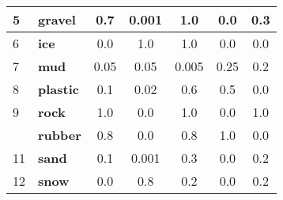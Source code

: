 \begin{table}[H]
\begin{tabular}{|l|l|c|c|c|c|c|}
\cellcolor[HTML]{737F9C}5                         & \textbf{gravel}        & 0.7                                     & 0.001                                      & 1.0                                    & 0.0                                      & 0.3                                  \\ \hline
\cellcolor[HTML]{D7E3FF}6                         & \textbf{ice}           & 0.0                                     & 1.0                                        & 1.0                                    & 0.0                                      & 0.0                                  \\ \hline
\cellcolor[HTML]{646464}7                         & \textbf{mud}           & 0.05                                    & 0.05                                       & 0.005                                  & 0.25                                     & 0.2                                  \\ \hline
\cellcolor[HTML]{96FABE}8                         & \textbf{plastic}       & 0.1                                     & 0.02                                       & 0.6                                    & 0.5                                      & 0.0                                  \\ \hline
\cellcolor[HTML]{6E5A3C}9                         & \textbf{rock}          & 1.0                                     & 0.0                                        & 1.0                                    & 0.0                                      & 1.0                                  \\ \hline
\cellcolor[HTML]{000000}{\color[HTML]{FFFFFF} 10} & \textbf{rubber}        & 0.8                                     & 0.0                                        & 0.8                                    & 1.0                                      & 0.0                                  \\ \hline
\cellcolor[HTML]{F2EE7C}11                        & \textbf{sand}          & 0.1                                     & 0.001                                      & 0.3                                    & 0.0                                      & 0.2                                  \\ \hline
\cellcolor[HTML]{FDB0FB}12                        & \textbf{snow}          & 0.0                                     & 0.8                                        & 0.2                                    & 0.0                                      & 0.2                                  \\ \hline

\end{tabular}
\end{table}
